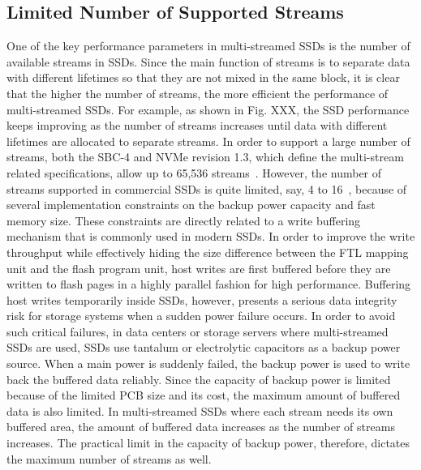 \subsection{Limited Number of Supported Streams}
One of the key performance parameters in multi-streamed SSDs is the number of 
available streams in SSDs.  
Since the main function of  streams is to separate data with different lifetimes 
so that they are not mixed in the same block, it is clear that the 
higher the number of streams, the more efficient the performance of multi-streamed SSDs.
For example, as shown in Fig. XXX,
the SSD performance keeps improving as the number of streams increases 
until data with different lifetimes are allocated to separate streams.   
In order to support a large number of streams, both the SBC-4 and NVMe revision 1.3, which define the 
multi-stream related specifications, allow up to 65,536 streams~\cite{T10, NVMe}.  
However, the number of streams supported in
commercial SSDs is quite limited, say, 4 to 16~\cite{MultiStream, Level, AutoStream}, 
because of several implementation constraints on the backup power capacity and fast memory size.
{\color{blue}
These constraints are directly related to a write buffering mechanism that is 
commonly used in modern SSDs.   In order to improve the write throughput while 
effectively hiding the size difference
between the FTL mapping unit and the flash program unit, host writes are first buffered 
before they are written to flash pages in a highly parallel fashion for high performance.  
Buffering host writes temporarily inside SSDs, however, presents a serious data integrity 
risk for storage systems when a sudden power failure occurs.  
In order to avoid such critical failures, in data centers or storage servers 
where multi-streamed SSDs are used,
SSDs use tantalum or electrolytic capacitors as a backup power source.  
}
When a main power is suddenly failed, the backup power is used to write back the
buffered data reliably.  
Since the capacity of backup power is limited because of the limited PCB size and 
its cost, the maximum amount of buffered data is also limited.  
In multi-streamed SSDs where
each stream needs its own buffered area, the amount of buffered data increases 
as the number of streams increases.  
The practical limit in the capacity of backup power, therefore, dictates the maximum
number of streams as well.

